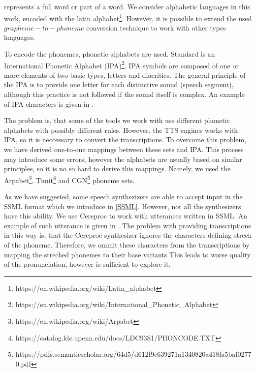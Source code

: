 represents a full word or part of a word.
We consider alphabetic languages in this work, encoded with the latin alphabet\footnote{https://en.wikipedia.org/wiki/Latin\_alphabet}.
However, it is possible to extend the used $grapheme-to-phoneme$ conversion technique \cite{bisani2008joint} to work with other types languages.
\par
To encode the phonemes, phonetic alphabets are used. Standard is an International Phonetic Alphabet (IPA)\footnote{https://en.wikipedia.org/wiki/International\_Phonetic\_Alphabet}.
IPA symbols are composed of one or more elements of two basic types, letters and diacritics.
The general principle of the IPA is to provide one letter for each distinctive sound (speech segment), although this practice is not followed if the sound itself is complex.
An example of IPA characters is given in .
\par
The problem is, that some of the tools we work with use different phonetic alphabets with possibly different rules.
However, the TTS engines works with IPA, so it is neccessary to convert the transcriptions.
To overcome this problem, we have derived one-to-one mappings between these sets and IPA.
This process may introduce some errors, however the alphabets are usually based on similar principles, so it is no so hard to derive this mappings.
Namely, we used the Arpabet\footnote{https://en.wikipedia.org/wiki/Arpabet}, Timit\footnote{https://catalog.ldc.upenn.edu/docs/LDC93S1/PHONCODE.TXT} and CGN\footnote{https://pdfs.semanticscholar.org/64d5/d612f9c639271a1340820a418fa5baf02770.pdf} phoneme sets.
\par
As we have suggested, some speech synthezizers are able to accept input in the SSML format which we introduce in \ref{SSML}.
However, not all the synthesizers have this ability.
We use Cereproc to work with utterances written in SSML.
An example of such utterance is given in .
The problem with providing transcriptions in this way is, that the Cereproc synthesizer ignores the characters defining strech of the phoneme.
Therefore, we ommit these characters from the transcriptions by mapping the streched phonemes to their base variants
This leads to worse quality of the pronunciation, however is sufficient to explore it.
